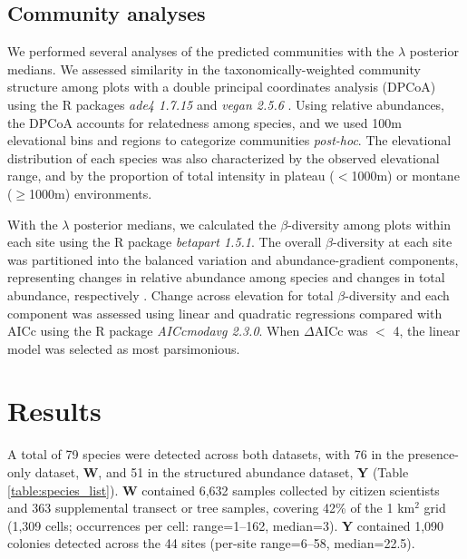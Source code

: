 \documentclass[preprint,final,times,12pt,3p]{elsarticle}
\begin{document}
\subsection{Community analyses}
We performed several analyses of the predicted communities with the $\lambda$ posterior medians. We assessed similarity in the taxonomically-weighted community structure among plots with a double principal coordinates analysis (DPCoA) using the R packages \emph{ade4 1.7.15} and \emph{vegan 2.5.6} \citep{Dray2015,Pavoine2019}. Using relative abundances, the DPCoA accounts for relatedness among species, and we used 100m elevational bins and regions to categorize communities \emph{post-hoc}. The elevational distribution of each species was also characterized by the observed elevational range, and by the proportion of total intensity in plateau ($<$1000m) or montane ($\geq$1000m) environments.

With the $\lambda$ posterior medians, we calculated the $\beta$-diversity among plots within each site using the R package \emph{betapart 1.5.1}. The overall $\beta$-diversity at each site was partitioned into the balanced variation and abundance-gradient components, representing changes in relative abundance among species and changes in total abundance, respectively \citep{Baselga2017}. Change across elevation for total $\beta$-diversity and each component was assessed using linear and quadratic regressions compared with AICc using the R package \emph{AICcmodavg 2.3.0}. When $\Delta$AICc was $<$ 4, the linear model was selected as most parsimonious. 




\section{Results}
\label{S:3}
A total of 79 species were detected across both datasets, with 76 in the presence-only dataset, \textbf{W}, and 51 in the structured abundance dataset, \textbf{Y} (Table \ref{table:species_list}). \textbf{W} contained 6,632 samples collected by citizen scientists and 363 supplemental transect or tree samples, covering 42\% of the 1 km$^2$ grid (1,309 cells; occurrences per cell: range=1–162, median=3). \textbf{Y} contained 1,090 colonies detected across the 44 sites (per-site range=6–58, median=22.5). 
\end{document}
